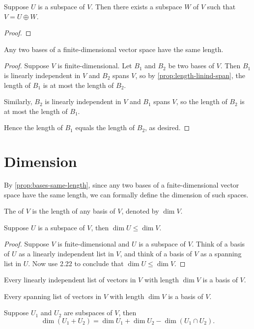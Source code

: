 \begin{proposition}
Suppose $U$ is a subspace of $V$. Then there exists a subspace $W$ of $V$ such that $V=U\oplus W$.
\end{proposition}

\begin{proof}

\end{proof}

\begin{proposition}\label{prop:bases-same-length}
Any two bases of a finite-dimensional vector space have the same length.
\end{proposition}

\begin{proof}
Suppose $V$ is finite-dimensional. Let $B_1$ and $B_2$ be two bases of $V$. Then $B_1$ is linearly independent in $V$ and $B_2$ spans $V$, so by \cref{prop:length-linind-span}, the length of $B_1$ is at most the length of $B_2$.

Similarly, $B_2$ is linearly independent in $V$ and $B_1$ spans $V$, so the length of $B_2$ is at most the length of $B_1$.

Hence the length of $B_1$ equals the length of $B_2$, as desired.
\end{proof}

\section{Dimension}
By \cref{prop:bases-same-length}, since any two bases of a fnite-dimensional vector space have the same length, we can formally define the dimension of such spaces.

\begin{definition}[Dimension]
The  of $V$ is the length of any basis of $V$, denoted by $\dim V$.
\end{definition}

\begin{proposition}
Suppose $U$ is a subspace of $V$, then $\dim U\le\dim V$.
\end{proposition}

\begin{proof}
Suppose $V$ is fnite-dimensional and $U$ is a subspace of $V$. Think of a basis of $U$ as a linearly independent list in $V$, and think of a basis of $V$ as a spanning list in $U$. Now use 2.22 to conclude that $\dim U\le\dim V$.
\end{proof}

\begin{proposition}
Every linearly independent list of vectors in $V$ with length $\dim V$ is a basis of $V$.
\end{proposition}

\begin{proposition}
Every spanning list of vectors in $V$ with length $\dim V$ is a basis of $V$.
\end{proposition}

\begin{lemma}
Suppose $U_1$ and $U_2$ are subspaces of $V$, then
\[\dim(U_1+U_2)=\dim U_1+\dim U_2-\dim(U_1\cap U_2).\]
\end{lemma}